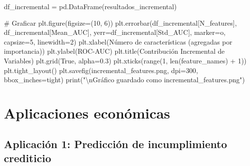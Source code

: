 \documentclass[
  doc,
  floatsintext,
  longtable,
  a4paper,
  nolmodern,
  notxfonts,
  notimes,
  12pt,
  colorlinks=true,linkcolor=blue,citecolor=blue,urlcolor=blue]{apa7}
\newenvironment{Shaded}{\begin{snugshade}}{\end{snugshade}}
\newcommand{\BuiltInTok}[1]{\textcolor[rgb]{0.00,0.23,0.31}{#1}}
\newcommand{\CharTok}[1]{\textcolor[rgb]{0.13,0.47,0.30}{#1}}
\newcommand{\CommentTok}[1]{\textcolor[rgb]{0.37,0.37,0.37}{#1}}
\newcommand{\DecValTok}[1]{\textcolor[rgb]{0.68,0.00,0.00}{#1}}
\newcommand{\FloatTok}[1]{\textcolor[rgb]{0.68,0.00,0.00}{#1}}
\newcommand{\NormalTok}[1]{\textcolor[rgb]{0.00,0.23,0.31}{#1}}
\newcommand{\OperatorTok}[1]{\textcolor[rgb]{0.37,0.37,0.37}{#1}}
\newcommand{\StringTok}[1]{\textcolor[rgb]{0.13,0.47,0.30}{#1}}
\newcommand{\VariableTok}[1]{\textcolor[rgb]{0.07,0.07,0.07}{#1}}
\begin{document}
\begin{Shaded}
\begin{Highlighting}[]
\NormalTok{df\_incremental }\OperatorTok{=}\NormalTok{ pd.DataFrame(resultados\_incremental)}

\CommentTok{\# Graficar}
\NormalTok{plt.figure(figsize}\OperatorTok{=}\NormalTok{(}\DecValTok{10}\NormalTok{, }\DecValTok{6}\NormalTok{))}
\NormalTok{plt.errorbar(df\_incremental[}\StringTok{\textquotesingle{}N\_features\textquotesingle{}}\NormalTok{], df\_incremental[}\StringTok{\textquotesingle{}Mean\_AUC\textquotesingle{}}\NormalTok{],}
\NormalTok{            yerr}\OperatorTok{=}\NormalTok{df\_incremental[}\StringTok{\textquotesingle{}Std\_AUC\textquotesingle{}}\NormalTok{], marker}\OperatorTok{=}\StringTok{\textquotesingle{}o\textquotesingle{}}\NormalTok{, capsize}\OperatorTok{=}\DecValTok{5}\NormalTok{, linewidth}\OperatorTok{=}\DecValTok{2}\NormalTok{)}
\NormalTok{plt.xlabel(}\StringTok{\textquotesingle{}Número de características (agregadas por importancia)\textquotesingle{}}\NormalTok{)}
\NormalTok{plt.ylabel(}\StringTok{\textquotesingle{}ROC{-}AUC\textquotesingle{}}\NormalTok{)}
\NormalTok{plt.title(}\StringTok{\textquotesingle{}Contribución Incremental de Variables\textquotesingle{}}\NormalTok{)}
\NormalTok{plt.grid(}\VariableTok{True}\NormalTok{, alpha}\OperatorTok{=}\FloatTok{0.3}\NormalTok{)}
\NormalTok{plt.xticks(}\BuiltInTok{range}\NormalTok{(}\DecValTok{1}\NormalTok{, }\BuiltInTok{len}\NormalTok{(feature\_names) }\OperatorTok{+} \DecValTok{1}\NormalTok{))}
\NormalTok{plt.tight\_layout()}
\NormalTok{plt.savefig(}\StringTok{\textquotesingle{}incremental\_features.png\textquotesingle{}}\NormalTok{, dpi}\OperatorTok{=}\DecValTok{300}\NormalTok{, bbox\_inches}\OperatorTok{=}\StringTok{\textquotesingle{}tight\textquotesingle{}}\NormalTok{)}
\BuiltInTok{print}\NormalTok{(}\StringTok{"}\CharTok{\textbackslash{}n}\StringTok{Gráfico guardado como \textquotesingle{}incremental\_features.png\textquotesingle{}"}\NormalTok{)}
\end{Highlighting}
\end{Shaded}

\section{Aplicaciones económicas}\label{aplicaciones-econuxf3micas}

\subsection{Aplicación 1: Predicción de incumplimiento
crediticio}\label{aplicaciuxf3n-1-predicciuxf3n-de-incumplimiento-crediticio}
\end{document}
